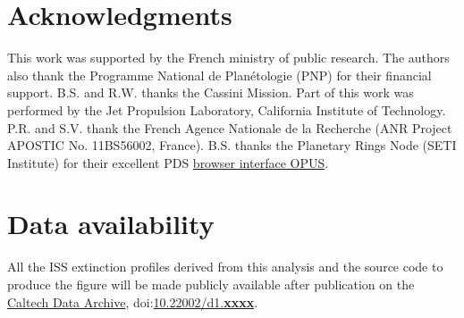 \section*{Acknowledgments}

This work was supported by the French ministry of public research. The authors also thank the Programme National de Plan\'{e}tologie (PNP) for their financial support.
B.S. and R.W. thanks the Cassini Mission. Part of this work was performed by the Jet Propulsion Laboratory, California Institute of Technology.
P.R. and S.V. thank the French Agence Nationale de la Recherche (ANR Project APOSTIC No. 11BS56002, France).
B.S. thanks the Planetary Rings Node (SETI Institute) for their excellent PDS \href{https://tools.pds-rings.seti.org/opus}{browser interface OPUS}.

\section*{Data availability}
All the ISS extinction profiles derived from this analysis and the source code to produce the figure will be made
publicly available after publication on the \href{https://data.caltech.edu}{Caltech Data Archive},
doi:\href{https://doi.org/10.22002/d1.xxxx}{10.22002/d1.\textbf{xxxx}}.